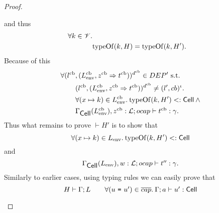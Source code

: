 \begin{proof}
\begin{description}
\begin{description}
\begin{description}
\begin{equation}
              \end{equation}
              and thus
              \begin{equation}
                \begin{aligned}
                  \forall k \in \mathscr{V} . \\
                    &\mbox{$\mathrm{typeOf}$}(k, H) = \mbox{$\mathrm{typeOf}$}(k, H').
                \end{aligned}
              \end{equation}
              Because of this
              \begin{equation}
                \begin{aligned}
                  \forall (l^{\text{cb}}&, (L^{\text{cb}}_{\text{env}},
                  z^{\text{cb}} \Rightarrow t^{\text{cb}}))^{d^{\text{cb}}} \in
                  DEP' \text{ s.t. }  \\
                  &(l^{\text{cb}}, (L^{\text{cb}}_{\text{env}}, z^{\text{cb}}
                  \Rightarrow t^{\text{cb}}))^{d^{\text{cb}}} \neq
                  (l', cb)^\iota. \\
                  &\forall (x \mapsto k) \in L^{\text{cb}}_{\text{env}}.\: \mbox{$\mathrm{typeOf}$}{(k, H')} <:
                  \mbox{$\mathsf{Cell}$} \: \land \\
                  &\mbox{$\Gamma_{\mbox{$\mathsf{Cell}$}{}}(L^{\text{cb}}_{\text{env}}), z^{\text{cb}}:
                  \mbox{$\mathcal{L}$};\mbox{$ocap$}\vdash t^{\text{cb}}:\gamma$}.
                \end{aligned}
              \end{equation}
              Thus what remains to prove $\vdash H'$ is to show that
              \begin{equation} \label{eq:ewhen-h1}
                \forall (x \mapsto k) \in L_{\text{env}}.\: \mbox{$\mathrm{typeOf}$}{(k, H')} <:
                \mbox{$\mathsf{Cell}$}
              \end{equation}
              and
              \begin{equation} \label{eq:ewhen-h2}
                \mbox{$\Gamma_{\mbox{$\mathsf{Cell}$}{}}(L_{\text{env}}), w:
                \mbox{$\mathcal{L}$};\mbox{$ocap$}\vdash t'':\gamma$}.
              \end{equation}
              Similarly to earlier cases, using typing rules we can easily prove
              that
              \begin{equation}\label{eq:ewhen-h3}
                H \vdash \Gamma; L \quad\quad \forall (\mbox{\mdseries$u$~\texttt{=}~$u'$}) \in
                \overline{cap}. \: \mbox{$\Gamma;a\vdash u':\mbox{$\mathsf{Cell}$}$} 
              \end{equation}

\end{description}
\end{description}
\end{description}
\end{proof}

